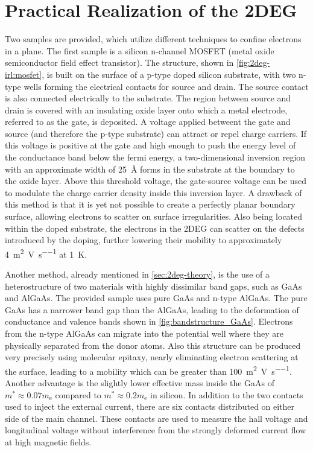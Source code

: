 \section{Practical Realization of the 2DEG}\label{sec:2deg-irl}
Two samples are provided, which utilize different techniques to confine electrons in a plane.
The first sample is a silicon n-channel MOSFET (metal oxide semiconductor field effect transistor).
The structure, shown in \autoref{fig:2deg-irl:mosfet}, is built on the surface of a p-type doped silicon substrate, with two n-type wells forming the electrical contacts for source and drain.
The source contact is also connected electrically to the substrate.
The region between source and drain is covered with an insulating oxide layer  onto which a metal electrode, referred to as the gate, is deposited.
A voltage applied betweent the gate and source (and therefore the p-type substrate) can attract or repel charge carriers.
If this voltage is positive at the gate and high enough to push the energy level of the conductance band below the fermi energy, a two-dimensional inversion region with an approximate width of \SI{25}{\angstrom} forms in the substrate at the boundary to the oxide layer.
Above this threshold voltage, the gate-source voltage can be used to modulate the charge carrier density inside this inversion layer.
A drawback of this method is that it is yet not possible to create a perfectly planar boundary surface, allowing electrons to scatter on surface irregularities.
Also being located within the doped substrate, the electrons in the 2DEG can scatter on the defects introduced by the doping, further lowering their mobility to approximately \SI{4}{\meter\squared\per\volt\per\second} at \SI{1}{\kelvin}.

Another method, already mentioned in \autoref{sec:2deg-theory}, is the use of a heterostructure of two materials with highly dissimilar band gaps, such as GaAs and AlGaAs.
The provided sample uses pure GaAs and n-type AlGaAs.
The pure GaAs has a narrower band gap than the AlGaAs, leading to the deformation of conductance and valence bands shown in \autoref{fig:bandstructure_GaAs}.
Electrons from the n-type AlGaAs can migrate into the potential well where they are physically separated from the donor atoms.
Also this structure can be produced very precisely using molecular epitaxy, nearly eliminating electron scattering at the surface, leading to a mobility which can be greater than \SI{100}{\meter\squared\per\volt\per\second}.
Another advantage is the slightly lower effective mass inside the GaAs of $m^* \approx \num{0.07} m_\text{e}$ compared to $m^* \approx \num{0.2} m_\text{e}$ in silicon.
In addition to the two contacts used to inject the external current, there are six contacts distributed on either side of the main channel.
These contacts are used to measure the hall voltage and longitudinal voltage without interference from the strongly deformed current flow at high magnetic fields.

